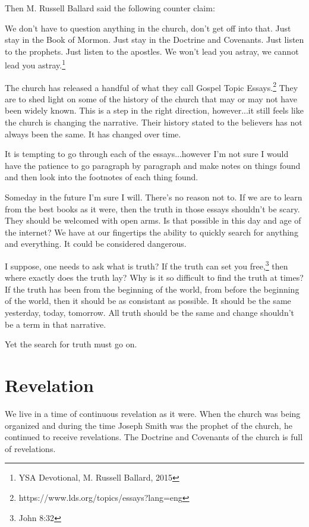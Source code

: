 \documentclass{article}
\begin{document}
Then M. Russell Ballard said the following counter claim:

\begin{displayquote}
We don't have to question anything in the church, don't get off into that. Just
stay in the Book of Mormon. Just stay in the Doctrine and Covenants. Just listen
to the prophets. Just listen to the apostles. We won't lead you astray, we
cannot lead you astray.\footnote{YSA Devotional, M. Russell Ballard, 2015}
\end{displayquote}

The church has released a handful of what they call Gospel Topic 
Essays.\footnote{https://www.lds.org/topics/essays?lang=eng} They are to shed
light on some of the history of the church that may or may not have been
widely known. This is a step in the right direction, however...it still feels
like the church is changing the narrative. Their history stated to the believers
has not always been the same. It has changed over time.

It is tempting to go through each of the essays...however I'm not sure I would
have the patience to go paragraph by paragraph and make notes on things found
and then look into the footnotes of each thing found.

Someday in the future I'm sure I will. There's no reason not to. If we are to
learn from the best books as it were, then the truth in those essays shouldn't
be scary. They should be welcomed with open arms. Is that possible in this day
and age of the internet? We have at our fingertips the ability to quickly search
for anything and everything. It could be considered dangerous.

I suppose, one needs to ask what is truth? If the truth can set you 
free,\footnote{John 8:32} then where exactly does the truth lay? Why is it so
difficult to find the truth at times? If the truth has been from the beginning
of the world, from before the beginning of the world, then it should be as
consistant as possible. It should be the same yesterday, today, tomorrow. All
truth should be the same and change shouldn't be a term in that narrative.

Yet the search for truth must go on.

\newpage

\section{Revelation}

We live in a time of continuous revelation as it were. When the church was
being organized and during the time Joseph Smith was the prophet of the church,
he continued to receive revelations. The Doctrine and Covenants of the church
is full of revelations.
\end{document}
